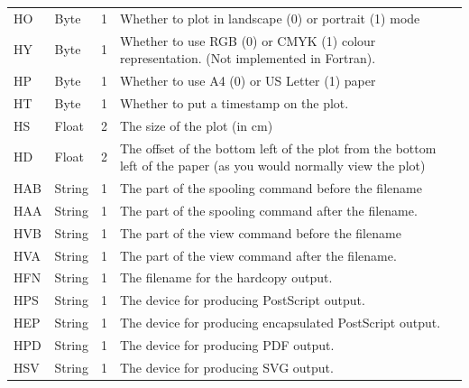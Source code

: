 \documentclass[english]{article}
\begin{document}
\begin{longtable}{|llcp{9cm}|}
  HO& Byte& 1&
  Whether to plot in landscape (0) or portrait (1) mode\\
  HY& Byte & 1 & Whether to use RGB (0) or CMYK (1) colour
  representation. (Not implemented in Fortran).\\
  HP& Byte& 1&
  Whether to use A4 (0) or US Letter (1) paper\\
  HT& Byte& 1&
  Whether to put a timestamp on the plot.\\
  HS& Float& 2&
  The size of the plot (in cm)\\
  HD& Float& 2& The offset of the bottom left of the plot from the
  bottom left of the
  paper (as you would normally view the plot)\\
  HAB& String& 1&
  The part of the spooling command before the filename\\
  HAA& String& 1&
  The part of the spooling command after the filename.\\
  HVB& String& 1&
  The part of the view command before the filename\\
  HVA& String& 1&
  The part of the view command after the filename.\\
  HFN& String & 1 & The filename for the hardcopy output.\\
  HPS & String & 1 & The device for producing PostScript output.\\
  HEP & String & 1 & The device for producing encapsulated PostScript output.\\
  HPD & String & 1 & The device for producing PDF output.\\
  HSV & String & 1 & The device for producing SVG output.\\


\end{longtable}
\end{document}
